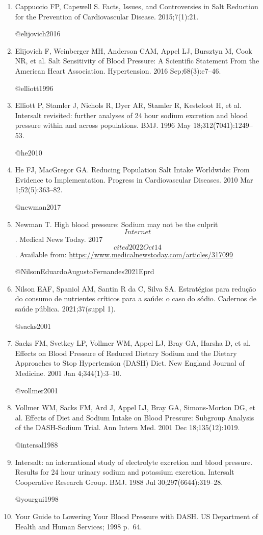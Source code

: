 \documentclass[
]{article}
\begin{document}
\begin{enumerate}
\def\labelenumi{\arabic{enumi}.}
\item
  Cappuccio FP, Capewell S. Facts, Issues, and Controversies in Salt
  Reduction for the Prevention of Cardiovascular Disease. 2015;7(1):21.

  @elijovich2016
\item
  Elijovich F, Weinberger MH, Anderson CAM, Appel LJ, Bursztyn M, Cook
  NR, et al. Salt Sensitivity of Blood Pressure: A Scientific Statement
  From the American Heart Association. Hypertension. 2016
  Sep;68(3):e7--46.

  @elliott1996
\item
  Elliott P, Stamler J, Nichols R, Dyer AR, Stamler R, Kesteloot H, et
  al. Intersalt revisited: further analyses of 24 hour sodium excretion
  and blood pressure within and across populations. BMJ. 1996 May
  18;312(7041):1249--53.

  @he2010
\item
  He FJ, MacGregor GA. Reducing Population Salt Intake Worldwide: From
  Evidence to Implementation. Progress in Cardiovascular Diseases. 2010
  Mar 1;52(5):363--82.

  @newman2017
\item
  Newman T. High blood pressure: Sodium may not be the culprit
  \[Internet\]. Medical News Today. 2017 \[cited 2022 Oct 14\].
  Available from: \url{https://www.medicalnewstoday.com/articles/317099}

  @NilsonEduardoAugustoFernandes2021Eprd
\item
  Nilson EAF, Spaniol AM, Santin R da C, Silva SA. Estratégias para
  redução do consumo de nutrientes críticos para a saúde: o caso do
  sódio. Cadernos de saúde pública. 2021;37(suppl 1).

  @sacks2001
\item
  Sacks FM, Svetkey LP, Vollmer WM, Appel LJ, Bray GA, Harsha D, et al.
  Effects on Blood Pressure of Reduced Dietary Sodium and the Dietary
  Approaches to Stop Hypertension (DASH) Diet. New England Journal of
  Medicine. 2001 Jan 4;344(1):3--10.

  @vollmer2001
\item
  Vollmer WM, Sacks FM, Ard J, Appel LJ, Bray GA, Simons-Morton DG, et
  al. Effects of Diet and Sodium Intake on Blood Pressure: Subgroup
  Analysis of the DASH-Sodium Trial. Ann Intern Med. 2001 Dec
  18;135(12):1019.

  @intersal1988
\item
  Intersalt: an international study of electrolyte excretion and blood
  pressure. Results for 24 hour urinary sodium and potassium excretion.
  Intersalt Cooperative Research Group. BMJ. 1988 Jul
  30;297(6644):319--28.

  @yourgui1998
\item
  Your Guide to Lowering Your Blood Pressure with DASH. US Department of
  Health and Human Services; 1998 p.~64.
\end{enumerate}
\end{document}
